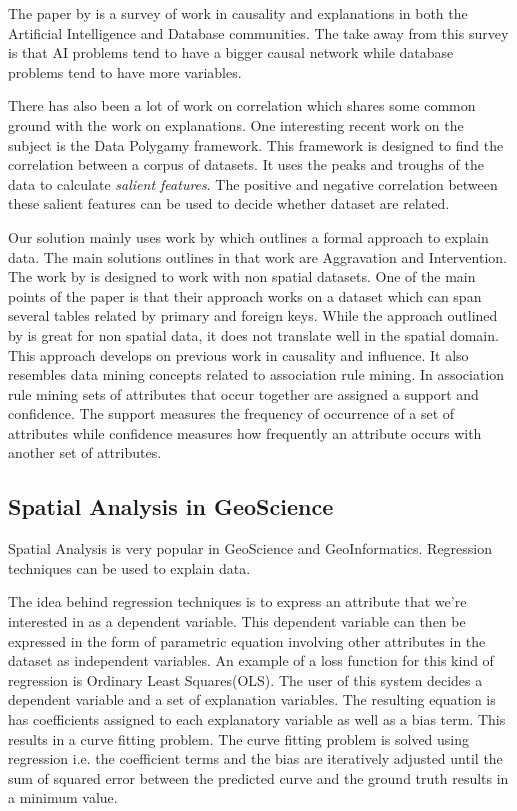 The paper by \cite{meliou2014causality} is a survey of work in causality and explanations in both the Artificial Intelligence and Database communities. The take away from this survey is that AI problems tend to have a bigger causal network while database problems tend to have more variables.

There has also been a lot of work on correlation which shares some common ground with the work on explanations. One interesting recent work on the subject is the Data Polygamy framework\citep{chirigati2016data}. This framework is designed to find the correlation between a corpus of datasets. It uses the peaks and troughs of the data to calculate \textit{salient features}. The positive and negative correlation between these salient features can be used to decide whether dataset are related. 

Our solution mainly uses work by \cite{roy2014formal} which outlines a formal approach to explain data. The main solutions outlines in that work are Aggravation and Intervention. The work by \cite{roy2014formal} is designed to work with non spatial datasets. One of the main points of the paper is that their approach works on a dataset which can span several tables related by primary and foreign keys. While the approach outlined by \cite{roy2014formal} is great for non spatial data, it does not translate well in the spatial domain. This approach develops on previous work in causality and influence. It also resembles data mining concepts related to association rule mining\citep{agarwal1994fast,tan2006introduction}. In association rule mining sets of attributes that occur together are assigned a support and confidence. The support measures the frequency of occurrence of a set of attributes while confidence measures how frequently an attribute occurs with another set of attributes.

\subsection{Spatial Analysis in GeoScience}
Spatial Analysis is very popular in GeoScience and GeoInformatics. Regression techniques can be used to explain data\citep{dunn1986applied,cleveland1988locally}. 

The idea behind regression techniques is to express an attribute that we're interested in as a dependent variable. This dependent variable can then be expressed in the form of parametric equation involving other attributes in the dataset as independent variables. An example of a loss function for this kind of regression is Ordinary Least Squares(OLS)\citep{dismuke2006ordinary}. The user of this system decides a dependent variable and a set of explanation variables. The resulting equation is has coefficients assigned to each explanatory variable as well as a bias term. This results in a curve fitting problem. The curve fitting problem is solved using regression i.e. the coefficient terms and the bias are iteratively adjusted until the sum of squared error between the predicted curve and the ground truth results in a minimum value. 

